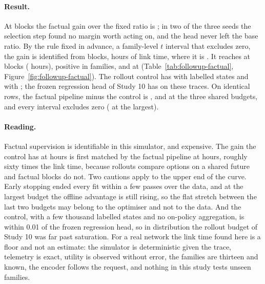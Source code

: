 \documentclass[10pt]{article}
\begin{document}
\paragraph{Result.}
At \TypedFactOneBlocks{} blocks the factual gain over the fixed ratio is \TypedFactOneGain{} \TypedFactOneGainT{}; in two of the three seeds the selection step found no margin worth acting on, and the head never left the base ratio. By the rule fixed in advance, a family-level $t$ interval that excludes zero, the gain is identified from \TypedFactIdentifiedBlocks{} blocks, \TypedFactIdentifiedHours{} hours of link time, where it is \TypedFactTwoGain{} \TypedFactTwoGainT{}. It reaches \TypedFactFourGain{} \TypedFactFourGainT{} at \TypedFactFourBlocks{} blocks (\TypedFactFourHours{} hours), positive in \TypedFactFourGainPositive{} families, and \TypedFactFiveGain{} at \TypedFactFiveBlocks{} (Table~\ref{tab:followup-factual}, Figure~\ref{fig:followup-factual}). The rollout control has \TypedFactOneControlGain{} \TypedFactOneControlGainT{} with \TypedFactOneBlocks{} labelled states and \TypedFactThreeControlGain{} with \TypedFactThreeBlocks{}; the frozen regression head of Study 10 has \TypedFactRefRegress{} on these traces. On identical rows, the factual pipeline minus the control is \TypedFactOnePrice{}, \TypedFactTwoPrice{} and \TypedFactThreePrice{} at the three shared budgets, and every interval excludes zero (\TypedFactThreePriceT{} at the largest).

\paragraph{Reading.}
Factual supervision is identifiable in this simulator, and expensive. The gain the control has at \TypedFactOneHours{} hours is first matched by the factual pipeline at \TypedFactFourHours{} hours, roughly sixty times the link time, because rollouts compare options on a shared future and factual blocks do not. Two cautions apply to the upper end of the curve. Early stopping ended every fit within a few passes over the data, and at the largest budget the offline advantage is still rising, so the flat stretch between the last two budgets may belong to the optimiser and not to the data. And the control, with a few thousand labelled states and no on-policy aggregation, is within 0.01 of the frozen regression head, so in distribution the rollout budget of Study 10 was far past saturation. For a real network the link time found here is a floor and not an estimate: the simulator is deterministic given the trace, telemetry is exact, utility is observed without error, the families are thirteen and known, the encoder follows the request, and nothing in this study tests unseen families.
\end{document}
